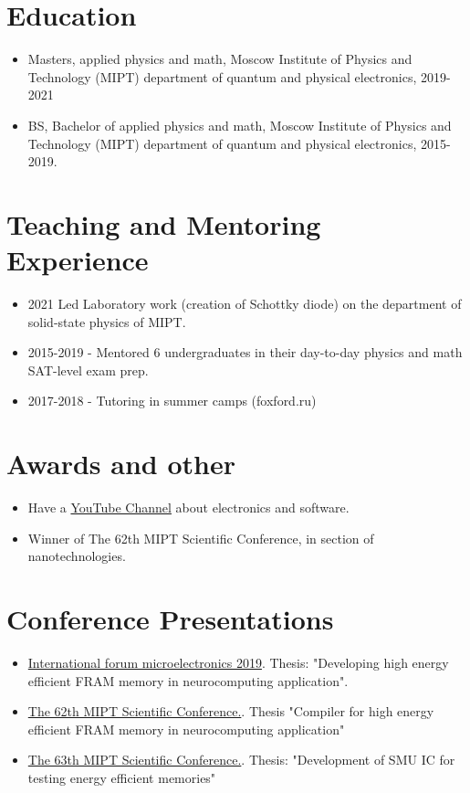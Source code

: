 \documentclass{article}
\begin{document}
 
\section{Education}
 
\begin{itemize}
\item Masters, applied physics and math, Moscow Institute of Physics and Technology (MIPT) department of quantum and physical electronics, 2019-2021
\item BS, Bachelor of applied physics and math, Moscow Institute of Physics and Technology (MIPT) department of quantum and physical electronics, 2015-2019.
\end{itemize}

\section{Teaching and Mentoring Experience }
\begin{itemize}
\item 2021 Led Laboratory work (creation of Schottky diode) on the department of solid-state physics of MIPT. 
\item 2015-2019 - Mentored 6 undergraduates in their day-to-day physics and math SAT-level exam prep.
\item 2017-2018 - Tutoring in summer camps (foxford.ru)
\end{itemize}
 
\section{Awards and other}
\begin{itemize}
\item Have a \href{https://www.youtube.com/channel/UCAjmXQnYQjWoVHx6NIo24CQ}{YouTube Channel} about electronics and software.   
\item Winner of The 62th MIPT Scientific Conference, in section of nanotechnologies.
\end{itemize}
 
\section{Conference Presentations }
 
\begin{itemize}
\item \href{https://microelectronica.pro/}{International forum microelectronics 2019}. Thesis: "Developing high energy efficient FRAM memory in neurocomputing application".
\item  \href{https://conf62.mipt.ru/}{The 62th MIPT Scientific Conference.}. Thesis "Compiler for high energy efficient FRAM memory in neurocomputing application"
\item \href{https://mipt.ru/science/5top100/education/courseproposal/%D0%A4%D0%AD%D0%A4%D0%9C.pdf}{The 63th MIPT Scientific Conference.}. Thesis: "Development of SMU IC for testing energy efficient memories"
\end{itemize}
 
\end{document}
